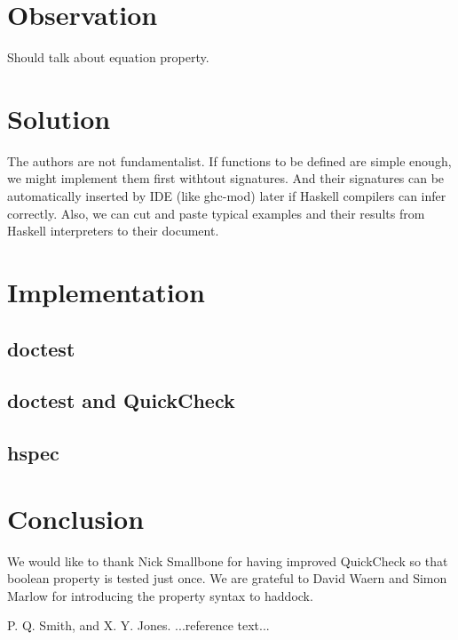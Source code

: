 \documentclass[preprint]{sigplanconf}
\begin{document}
\section{Observation}

Should talk about equation property.

\section{Solution}

The authors are not fundamentalist.
If functions to be defined are simple enough,
we might implement them first withtout signatures.
And their signatures can be automatically
inserted by IDE (like ghc-mod) later
if Haskell compilers can infer correctly.
Also, we can cut and paste typical examples and their results
from Haskell interpreters to their document.

\section{Implementation}

\subsection{doctest}

\subsection{doctest and QuickCheck}

\subsection{hspec}

\section{Conclusion}



\acks

We would like to thank
Nick Smallbone for having improved QuickCheck so that boolean property is tested
just once.
We are grateful to David Waern and Simon Marlow
for introducing the property syntax to haddock.






\begin{thebibliography}{}
\softraggedright

P. Q. Smith, and X. Y. Jones. ...reference text...

\end{thebibliography}
\end{document}
